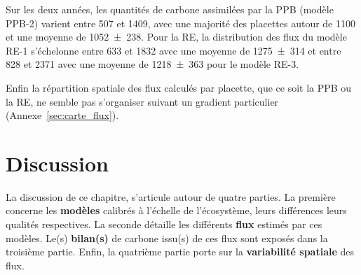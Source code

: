 Sur les deux années, les quantités de carbone assimilées par la PPB (modèle PPB-2) varient entre 507 et \SI{1409}{\gcma}, avec une majorité des placettes autour de \SI{1100}{\gcma} et une moyenne de \SI{1052(238)}{\gcma}.
Pour la RE, la distribution des flux du modèle RE-1 s'échelonne entre 633 et \SI{1832}{\gcma} avec une moyenne de \SI{1275(314)}{\gcma} et entre 828 et \SI{2371}{\gcma} avec une moyenne de \SI{1218(363)}{\gcma} pour le modèle RE-3.

Enfin la répartition spatiale des flux calculés par placette, que ce soit la PPB ou la RE, ne semble pas s'organiser suivant un gradient particulier (Annexe~\ref{sec:carte_flux}).








\section{Discussion}

La discussion de ce chapitre, s'articule autour de quatre parties.
La première concerne les \textbf{modèles} calibrés à l'échelle de l'écosystème, leurs différences leurs qualités respectives.
La seconde détaille les différents \textbf{flux} estimés par ces modèles.
Le(s) \textbf{bilan(s)} de carbone issu(s) de ces flux sont exposés dans la troisième partie.
Enfin, la quatrième partie porte sur la \textbf{variabilité spatiale} des flux.

